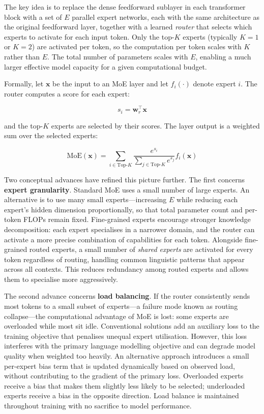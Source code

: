 \documentclass{book}
\begin{document}
The key idea is to replace the dense feedforward sublayer in each transformer
block with a set of $E$ parallel expert networks, each with the same
architecture as the original feedforward layer, together with a learned
\emph{router} that selects which experts to activate for each input token.
Only the top-$K$ experts (typically $K = 1$ or $K = 2$) are activated per
token, so the computation per token scales with $K$ rather than $E$. The
total number of parameters scales with $E$, enabling a much larger effective
model capacity for a given computational budget.

Formally, let $\mathbf{x}$ be the input to an MoE layer and let $f_i(\cdot)$
denote expert $i$. The router computes a score for each expert:

\begin{equation}
s_i = \mathbf{w}_r^\top \mathbf{x}
\end{equation}

and the top-$K$ experts are selected by their scores. The layer output is a
weighted sum over the selected experts:

\begin{equation}
\text{MoE}(\mathbf{x})
= \sum_{i \in \text{Top-}K} \frac{e^{s_i}}{\sum_{j \in \text{Top-}K} e^{s_j}} f_i(\mathbf{x})
\end{equation}

Two conceptual advances have refined this picture further. The first concerns
\textbf{expert granularity}. Standard MoE uses a small number of large
experts. An alternative is to use many small experts---increasing $E$ while
reducing each expert's hidden dimension proportionally, so that total parameter
count and per-token FLOPs remain fixed. Fine-grained experts encourage stronger
knowledge decomposition: each expert specialises in a narrower domain, and the
router can activate a more precise combination of capabilities for each token.
Alongside fine-grained routed experts, a small number of \emph{shared experts}
are activated for every token regardless of routing, handling common linguistic
patterns that appear across all contexts. This reduces redundancy among routed
experts and allows them to specialise more aggressively.

The second advance concerns \textbf{load balancing}. If the router consistently
sends most tokens to a small subset of experts---a failure mode known as routing
collapse---the computational advantage of MoE is lost: some experts are
overloaded while most sit idle. Conventional solutions add an auxiliary
loss to the training objective that penalises unequal expert utilisation.
However, this loss interferes with the primary language modelling objective and
can degrade model quality when weighted too heavily. An alternative approach
introduces a small per-expert bias term that is updated dynamically based on
observed load, without contributing to the gradient of the primary loss.
Overloaded experts receive a bias that makes them slightly less likely to be
selected; underloaded experts receive a bias in the opposite direction. Load
balance is maintained throughout training with no sacrifice to model
performance.
\end{document}
